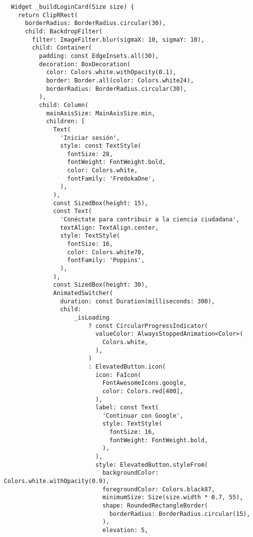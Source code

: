 \begin{verbatim}
  Widget _buildLoginCard(Size size) {
    return ClipRRect(
      borderRadius: BorderRadius.circular(30),
      child: BackdropFilter(
        filter: ImageFilter.blur(sigmaX: 10, sigmaY: 10),
        child: Container(
          padding: const EdgeInsets.all(30),
          decoration: BoxDecoration(
            color: Colors.white.withOpacity(0.1),
            border: Border.all(color: Colors.white24),
            borderRadius: BorderRadius.circular(30),
          ),
          child: Column(
            mainAxisSize: MainAxisSize.min,
            children: [
              Text(
                'Iniciar sesión',
                style: const TextStyle(
                  fontSize: 28,
                  fontWeight: FontWeight.bold,
                  color: Colors.white,
                  fontFamily: 'FredokaOne',
                ),
              ),
              const SizedBox(height: 15),
              const Text(
                'Conéctate para contribuir a la ciencia ciudadana',
                textAlign: TextAlign.center,
                style: TextStyle(
                  fontSize: 16,
                  color: Colors.white70,
                  fontFamily: 'Poppins',
                ),
              ),
              const SizedBox(height: 30),
              AnimatedSwitcher(
                duration: const Duration(milliseconds: 300),
                child:
                    _isLoading
                        ? const CircularProgressIndicator(
                          valueColor: AlwaysStoppedAnimation<Color>(
                            Colors.white,
                          ),
                        )
                        : ElevatedButton.icon(
                          icon: FaIcon(
                            FontAwesomeIcons.google,
                            color: Colors.red[400],
                          ),
                          label: const Text(
                            'Continuar con Google',
                            style: TextStyle(
                              fontSize: 16,
                              fontWeight: FontWeight.bold,
                            ),
                          ),
                          style: ElevatedButton.styleFrom(
                            backgroundColor: Colors.white.withOpacity(0.9),
                            foregroundColor: Colors.black87,
                            minimumSize: Size(size.width * 0.7, 55),
                            shape: RoundedRectangleBorder(
                              borderRadius: BorderRadius.circular(15),
                            ),
                            elevation: 5,

\end{verbatim}
